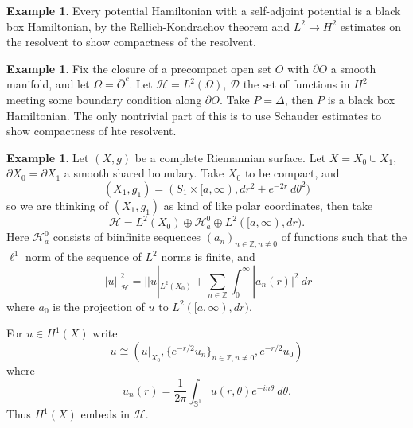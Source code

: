 \documentclass[12pt]{report}
\newcommand{\ZZ}{\mathbb{Z}}
\newcommand{\Sphere}{\mathbb S}
\theoremstyle{definition}
\newtheorem{example}[theorem]{Example}
\begin{document}
\begin{example}
Every potential Hamiltonian with a self-adjoint potential is a black box Hamiltonian, by the Rellich-Kondrachov theorem and $L^2 \to H^2$ estimates on the resolvent to show compactness of the resolvent.
\end{example}
\begin{example}
Fix the closure of a precompact open set $O$ with $\partial O$ a smooth manifold, and let $\Omega = \overline O^c$.
Let $\mathcal H = L^2(\Omega)$, $\mathcal D$ the set of functions in $H^2$ meeting some boundary condition along $\partial O$.
Take $P = \Delta$, then $P$ is a black box Hamiltonian. The only nontrivial part of this is to use Schauder estimates to show compactness of hte resolvent.
\end{example}
\begin{example}
Let $(X, g)$ be a complete Riemannian surface.
Let $X = X_0 \cup X_1$, $\partial X_0 = \partial X_1$ a smooth shared boundary.
Take $X_0$ to be compact, and
$$(X_1, g_1) = (S_1 \times [a, \infty), dr^2 + e^{-2r}~d\theta^2)$$
so we are thinking of $(X_1, g_1)$ as kind of like polar coordinates,
then take
$$\mathcal H = L^2(X_0) \oplus \mathcal H^0_a \oplus L^2([a, \infty), dr).$$
Here $\mathcal H^0_a$ consists of biinfinite sequences $(a_n)_{n \in \ZZ,n \neq 0}$ of functions such that the $\ell^1$ norm of the sequence of $L^2$ norms is finite, and
$$||u||_{\mathcal H}^2 = ||u|_{L^2(X_0)} + \sum_{n \in \ZZ} \int_0^\infty |a_n(r)|^2~dr$$
where $a_0$ is the projection of $u$ to $L^2([a, \infty), dr)$.

For $u \in H^1(X)$ write
$$u \cong (u|_{X_0}, \{e^{-r/2}u_n\}_{n \in \ZZ,n\neq 0}, e^{-r/2}u_0 )$$
where
$$u_n(r) = \frac{1}{2\pi} \int_{\Sphere^1} u(r, \theta)e^{-in\theta}~d\theta.$$
Thus $H^1(X)$ embeds in $\mathcal H$.
\end{example}
\end{document}
